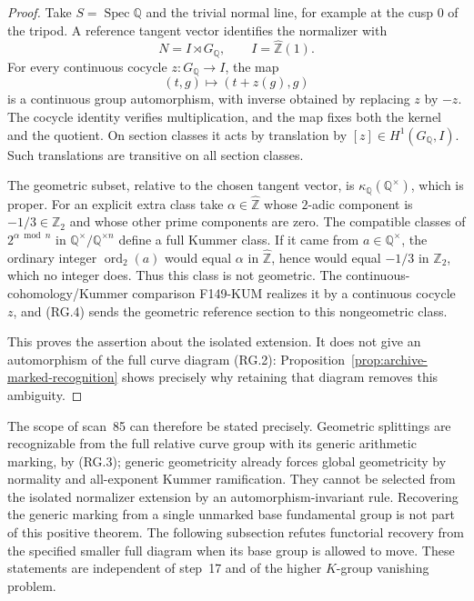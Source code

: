\begin{proof}
Take $S=\operatorname{Spec}\mathbb Q$ and the trivial normal line,
for example at the cusp $0$ of the tripod. A reference tangent
vector identifies the normalizer with
\[
 N=I\rtimes G_{\mathbb Q},\qquad I=\widehat{\mathbb Z}(1).
\]
For every continuous cocycle $z:G_{\mathbb Q}\to I$, the map
\[
 (t,g)\longmapsto(t+z(g),g)                                 \tag{RG.4}
\]
is a continuous group automorphism, with inverse obtained by
replacing $z$ by $-z$. The cocycle identity verifies multiplication,
and the map fixes both the kernel and the quotient. On section
classes it acts by translation by $[z]\in H^1(G_{\mathbb Q},I)$.
Such translations are transitive on all section classes.

The geometric subset, relative to the chosen tangent vector, is
$\kappa_{\mathbb Q}(\mathbb Q^\times)$, which is proper.
For an explicit extra class take
$\alpha\in\widehat{\mathbb Z}$ whose $2$-adic component is
$-1/3\in\mathbb Z_2$ and whose other prime components are zero.
The compatible classes of $2^{\alpha\bmod n}$ in
$\mathbb Q^\times/\mathbb Q^{\times n}$ define a full Kummer class.
If it came from $a\in\mathbb Q^\times$, the ordinary integer
$\operatorname{ord}_2(a)$ would equal $\alpha$ in
$\widehat{\mathbb Z}$, hence would equal $-1/3$ in $\mathbb Z_2$,
which no integer does. Thus this class is not geometric.
The continuous-cohomology/Kummer comparison F149-KUM realizes it
by a continuous cocycle $z$, and (RG.4) sends the geometric
reference section to this nongeometric class.

This proves the assertion about the isolated extension. It does
not give an automorphism of the full curve diagram (RG.2):
Proposition~\ref{prop:archive-marked-recognition} shows precisely
why retaining that diagram removes this ambiguity.
\end{proof}

The scope of scan~85 can therefore be stated precisely. Geometric
splittings are recognizable from the full relative curve group
with its generic arithmetic marking, by (RG.3); generic geometricity
already forces global geometricity by normality and all-exponent
Kummer ramification. They cannot be selected from the isolated
normalizer extension by an automorphism-invariant rule. Recovering
the generic marking from a single unmarked base fundamental group
is not part of this positive theorem. The following subsection
refutes functorial recovery from the specified smaller full diagram
when its base group is allowed to move.
These statements are independent of step~17 and of the higher
$K$-group vanishing problem.
